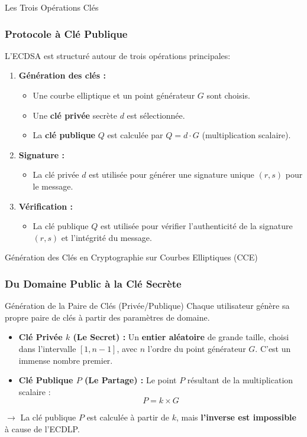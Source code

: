 \begin{frame}{Les Trois Opérations Clés}
\frametitle{Protocole à Clé Publique}

L'ECDSA est structuré autour de trois opérations principales:

\begin{enumerate}
    \item \textbf{Génération des clés :}
    \begin{itemize}
        \item Une courbe elliptique et un point générateur $G$ sont choisis.
        \item Une \textbf{clé privée} secrète $d$ est sélectionnée.
        \item La \textbf{clé publique} $Q$ est calculée par $Q = d \cdot G$ (multiplication scalaire).
    \end{itemize}
    \item \textbf{Signature :}
    \begin{itemize}
        \item La clé privée $d$ est utilisée pour générer une signature unique $(r, s)$ pour le message.
    \end{itemize}
    \item \textbf{Vérification :}
    \begin{itemize}
        \item La clé publique $Q$ est utilisée pour vérifier l'authenticité de la signature $(r, s)$ et l'intégrité du message.
    \end{itemize}
\end{enumerate}
\end{frame}

\begin{frame}{Génération des Clés en Cryptographie sur Courbes Elliptiques (CCE)}
\frametitle{Du Domaine Public à la Clé Secrète}



\begin{block}{Génération de la Paire de Clés (Privée/Publique)}
    Chaque utilisateur génère sa propre paire de clés à partir des paramètres de domaine.
    \begin{itemize}
        \item \textbf{Clé Privée $k$ (Le Secret) :} Un \textbf{entier aléatoire} de grande taille, choisi dans l'intervalle $[1, n-1]$, avec $n$ l'ordre du point générateur $G$. C'est un immense nombre premier.
        \item \textbf{Clé Publique $P$ (Le Partage) :} Le point $P$ résultant de la multiplication scalaire :
        $$P = k \times G$$
    \end{itemize}
    $\rightarrow$ La clé publique $P$ est calculée à partir de $k$, mais \textbf{l'inverse est impossible} à cause de l'ECDLP.
\end{block}

\end{frame}

